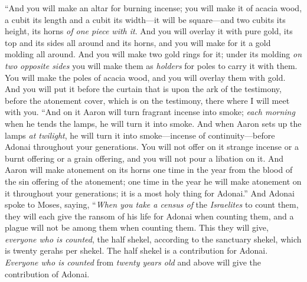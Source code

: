 \begin{biblechapter} %
 “And you will make an altar for burning incense; you will make it of acacia wood,
\verse a cubit its length and a cubit its width—it will be square—and two cubits its height, its horns \textit{of one piece with it}.
\verse And you will overlay it with pure gold, its top and its sides all around and its horns, and you will make for it a gold molding all around.
\verse And you will make two gold rings for it; under its molding \textit{on two opposite sides} you will make them as \textit{holders} for poles to carry it with them.
\verse You will make the poles of acacia wood, and you will overlay them with gold.
\verse And you will put it before the curtain that is upon the ark of the testimony, before the atonement cover, which is on the testimony, there where I will meet with you.
\verse “And on it Aaron will turn fragrant incense into smoke; \textit{each morning} when he tends the lamps, he will turn it into smoke.
\verse And when Aaron sets up the lamps \textit{at twilight}, he will turn it into smoke—incense of continuity—before Adonai throughout your generations.
\verse You will not offer on it strange incense or a burnt offering or a grain offering, and you will not pour a libation on it.
\verse And Aaron will make atonement on its horns one time in the year from the blood of the sin offering of the atonement; one time in the year he will make atonement on it throughout your generations; it is a most holy thing for Adonai.”
 And Adonai spoke to Moses, saying,
\verse “\textit{When you take a census of} the \textit{Israelites} to count them, they will each give the ransom of his life for Adonai when counting them, and a plague will not be among them when counting them.
\verse This they will give, \textit{everyone who is counted}, the half shekel, according to the sanctuary shekel, which is twenty gerahs per shekel. The half shekel is a contribution for Adonai.
\verse \textit{Everyone who is counted} from \textit{twenty years old} and above will give the contribution of Adonai.

\end{biblechapter}

